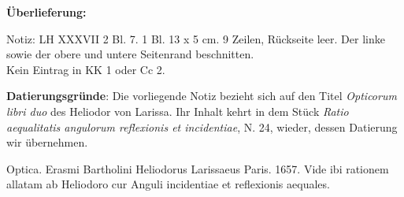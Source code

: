      
               
                \begin{ledgroupsized}[r]{120mm}
                \footnotesize 
                \pstart                
                \noindent\textbf{\"{U}berlieferung:}   
                \pend
                \end{ledgroupsized}
            
              
                            \begin{ledgroupsized}[r]{114mm}
                            \footnotesize 
                            \pstart \parindent -6mm
                            Notiz: LH XXXVII 2 Bl. 7. 1 Bl. 13 x 5 cm. 9 Zeilen, R\"{u}ckseite leer. Der linke sowie der obere und untere Seitenrand beschnitten.\\Kein Eintrag in KK 1 oder Cc 2. \pend
                            \end{ledgroupsized}
                \vspace*{5mm}
                \begin{ledgroup}
                \footnotesize 
                \pstart
            \noindent\footnotesize{\textbf{Datierungsgr\"{u}nde}: Die vorliegende Notiz bezieht sich auf den Titel \cite{00007}\textit{Opticorum libri duo} des Heliodor von Larissa. Ihr Inhalt kehrt in dem St\"{u}ck \textit{Ratio aequalitatis angulorum reflexionis et incidentiae}, N. 24, wieder, dessen Datierung wir \"{u}bernehmen.}
                \pend
                \end{ledgroup}
            
                \vspace*{8mm}
                \pstart 
                \normalsize
            \centering [7 r\textsuperscript{o}] Optica. \pend \vspace{1.0ex} \pstart Erasmi Bartholini\protect{} Heliodorus Larissaeus\protect{} Paris. 1657. Vide ibi rationem allatam ab Heliodoro\protect{} cur Anguli incidentiae\protect{} et reflexionis\protect{} aequales.\pend 